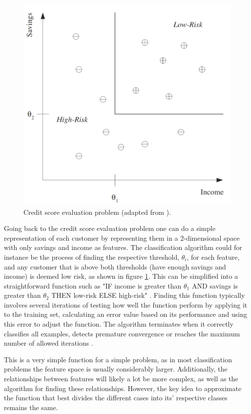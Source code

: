 \begin{figure}
    \centering
    \includegraphics[width=0.5\columnwidth]{figs/machinelearning.PNG}
    \caption[Credit score evaluation problem]
    {Credit score evaluation problem (adapted from \cite{alpaydin2009introduction}).}
    \label{fig:credit-score-evaluation}
\end{figure}

Going back to the credit score evaluation problem one can do a simple representation of each customer by representing them in a 2-dimensional space with only savings and income as features. The classification algorithm could for instance be the process of finding the respective threshold, $\theta_i$, for each feature, and any customer that is above both thresholds (have enough savings and income) is deemed low risk, as shown in figure \ref{fig:credit-score-evaluation}. This can be simplified into a straightforward function such as "IF income is greater than $\theta_1$ AND savings is greater than $\theta_2$ THEN low-risk ELSE high-risk" \cite{alpaydin2009introduction}. Finding this function typically involves several iterations of testing how well the function perform by applying it to the training set, calculating an error value based on its performance and using this error to adjust the function. The algorithm terminates when it correctly classifies all examples, detects premature convergence or reaches the maximum number of allowed iterations \cite{mitchell1997machine}.

This is a very simple function for a simple problem, as in most classification problems the feature space is usually considerably larger. Additionally, the relationships between features will likely a lot be more complex, as well as the algorithm for finding these relationships. However, the key idea to approximate the function that best divides the different cases into its' respective classes remains the same.


